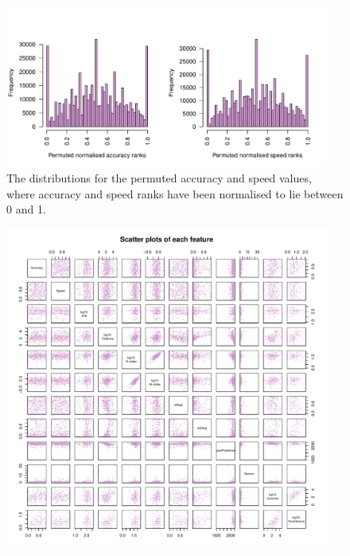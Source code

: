 \documentclass[fleqn,10pt]{SelfArx} %
\begin{document}
\begin{figure}[htb!]
\centering
\includegraphics[width=0.95\textwidth]{supplementary-distributions-permuted.pdf}
\caption{The distributions for the permuted accuracy and speed values, where accuracy and speed ranks have been normalised to lie between 0 and 1.
}
\label{fig:metricDistributionsPerm}
\end{figure}

\clearpage

\begin{figure}[H]
\centering
\includegraphics[width=0.95\textwidth]{supplementary-figures-pairs.pdf}
\caption{}
\label{fig:metricPairs}
\end{figure}
\end{document}
